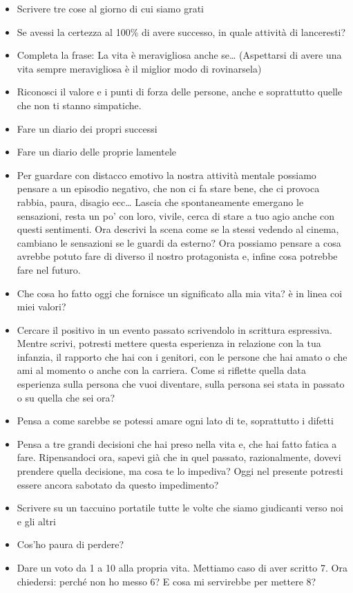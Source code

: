 \documentclass[12pt]{book} %
\begin{document}
\begin{itemize}
\item Scrivere tre cose al giorno di cui siamo grati
\item Se avessi la certezza al 100\% di avere successo, in quale attività di lanceresti?
\item Completa la frase: La vita è meravigliosa anche se… (Aspettarsi di avere una vita sempre meravigliosa è il miglior modo di rovinarsela)
\item Riconosci il valore e i punti di forza delle persone, anche e soprattutto quelle che non ti stanno simpatiche. 
\item Fare un diario dei propri successi 
\item Fare un diario delle proprie lamentele 
\item Per guardare con distacco emotivo la nostra attività mentale possiamo pensare a un episodio negativo, che non ci fa stare bene, che ci provoca rabbia, paura, disagio ecc… Lascia che spontaneamente emergano le sensazioni, resta un po' con loro, vivile, cerca di stare a tuo agio anche con questi sentimenti. Ora descrivi la scena come se la stessi vedendo al cinema, cambiano le sensazioni se le guardi da esterno? Ora possiamo pensare a cosa avrebbe potuto fare di diverso il nostro protagonista e, infine cosa potrebbe fare nel futuro.
\item Che cosa ho fatto oggi che fornisce un significato alla mia vita? è in linea coi miei valori? 
\item Cercare il positivo in un evento passato scrivendolo in scrittura espressiva. Mentre scrivi, potresti mettere
questa esperienza in relazione con la tua infanzia, il rapporto che hai con i genitori, con le persone che hai amato o
che ami al momento o anche con la carriera. Come si riflette quella data esperienza sulla persona che vuoi diventare,
sulla persona sei stata in passato o su quella che sei ora?
\item Pensa a come sarebbe se potessi amare ogni lato di te, soprattutto i difetti
\item Pensa a tre grandi decisioni che hai preso nella vita e, che hai fatto fatica a fare. Ripensandoci ora, sapevi già
che in quel passato, razionalmente, dovevi prendere quella decisione, ma cosa te lo impediva? Oggi nel presente
potresti essere ancora sabotato da questo impedimento?
\item Scrivere su un taccuino portatile tutte le volte che siamo giudicanti verso noi e gli altri
\item Cos'ho paura di perdere?
\item Dare un voto da 1 a 10 alla propria vita. Mettiamo caso di aver scritto 7. Ora chiedersi: perché non ho messo 6? E
cosa mi servirebbe per mettere 8? 
\end{itemize}
\end{document}
